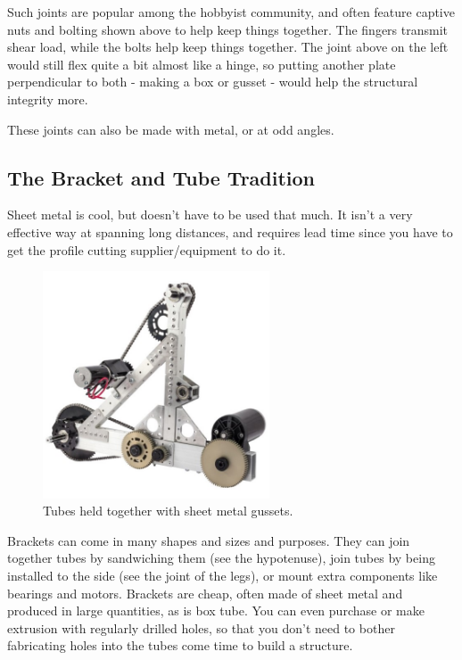 	Such joints are popular among the hobbyist community, and often feature captive nuts and bolting shown above to help keep things together. The fingers transmit shear load, while the bolts help keep things together. The joint above on the left would still flex quite a bit almost like a hinge, so putting another plate perpendicular to both - making a box or gusset - would help the structural integrity more.
	
	These joints can also be made with metal, or at odd angles.
	
	\subsection{The Bracket and Tube Tradition}
		
	Sheet metal is cool, but doesn't have to be used that much. It isn't a very effective way at spanning long distances, and requires lead time since you have to get the profile cutting supplier/equipment to do it.
	
	\begin{figure}[H]
		\includegraphics[width=0.6\textwidth]{imgs/tradition_gussetbox.jpeg}
		\caption{Tubes held together with sheet metal gussets.}
	\end{figure}
	
	Brackets can come in many shapes and sizes and purposes. They can join together tubes by sandwiching them (see the hypotenuse), join tubes by being installed to the side (see the joint of the legs), or mount extra components like bearings and motors. Brackets are cheap, often made of sheet metal and produced in large quantities, as is box tube. You can even purchase or make extrusion with regularly drilled holes, so that you don't need to bother fabricating holes into the tubes come time to build a structure.
	
